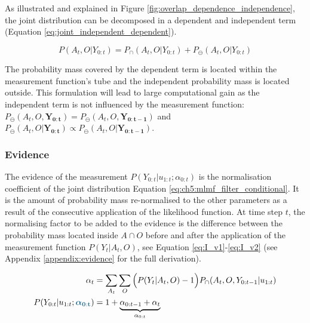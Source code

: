 As illustrated and explained in Figure \ref{fig:overlap_dependence_independence}, the joint distribution can be decomposed in a 
dependent and independent term (Equation \ref{eq:joint_independent_dependent}). 

\begin{equation}\label{eq:joint_independent_dependent}
 P(A_t,O|Y_{0:t}) = P_{\cap}(A_t,O|Y_{0:t}) + P_{\ominus}(A_t,O|Y_{0:t})
\end{equation}

The probability mass covered by the dependent term is located within the measurement function's tube and the independent probability mass 
is located outside. This formulation will lead to large computational gain 
as the independent term is not influenced by the measurement function: 
${P_{\ominus}(A_t,O,\mathbf{Y_{0:t}}) = P_{\ominus}(A_t,O,\mathbf{Y_{0:t-1}})}$ and ${P_{\ominus}(A_t,O|\mathbf{Y_{0:t}}) \propto P_{\ominus}(A_t,O|\mathbf{Y_{0:t-1}})}$.

\subsubsection{Evidence}
The evidence of the measurement $P(Y_{0:t}|u_{1:t};\alpha_{0:t})$ is the normalisation coefficient of the joint distribution Equation \ref{eq:ch5:mlmf_filter_conditional}.
It is the amount of probability mass re-normalised to the other parameters as a result of the consecutive application of the likelihood function.
At time step $t$, the normalising factor to be added to the evidence is the difference between the probability mass located 
inside $A\cap O$ before and after the application of the measurement function $P(Y_t|A_t,O)$, 
see Equation \ref{eq:I_v1}-\ref{eq:I_v2} (see Appendix \ref{appendix:evidence} for the full derivation).

\begin{align}
 \alpha_t 			 	&= \sum\limits_{A_t}\sum\limits_{O} \Big(P(Y_t|A_t,O) - 1\Big)P_{\cap}(A_t,O,Y_{0:t-1}|u_{1:t}) \label{eq:I_v1} \\
 P(Y_{0:t}|u_{1:t};\mathcolor{dark-blue}{\BAlph})        &= 1 + \underbrace{\alpha_{0:t-1} + \alpha_t}_{\alpha_{0:t}} \label{eq:I_v2}
\end{align}

